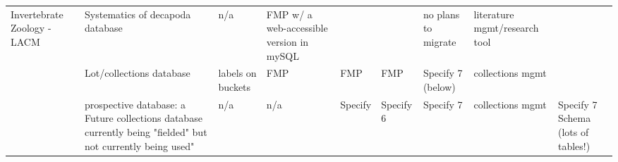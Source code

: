 \begin{tabular}{@{}lllllllll@{}}
\multicolumn{1}{|l|}{\multirow{3}{*}{Invertebrate Zoology - LACM}} & \multicolumn{1}{l|}{Systematics of decapoda database} & \multicolumn{1}{l|}{n/a} & \multicolumn{1}{l|}{FMP w/ a web-accessible version in mySQL} & \multicolumn{1}{l|}{} & \multicolumn{1}{l|}{} & \multicolumn{1}{l|}{no plans to migrate} & \multicolumn{1}{l|}{literature mgmt/research tool} &  \\ \cmidrule(lr){2-8}
\multicolumn{1}{|l|}{} & \multicolumn{1}{l|}{Lot/collections database} & \multicolumn{1}{l|}{labels on buckets} & \multicolumn{1}{l|}{FMP} & \multicolumn{1}{l|}{FMP} & \multicolumn{1}{l|}{FMP} & \multicolumn{1}{l|}{Specify 7 (below)} & \multicolumn{1}{l|}{collections mgmt} &  \\ \cmidrule(l){2-9} 
\multicolumn{1}{|l|}{} & \multicolumn{1}{l|}{prospective database: a Future collections database currently being "fielded" but not currently being used"} & \multicolumn{1}{l|}{n/a} & \multicolumn{1}{l|}{n/a} & \multicolumn{1}{l|}{Specify} & \multicolumn{1}{l|}{Specify 6} & \multicolumn{1}{l|}{Specify 7} & \multicolumn{1}{l|}{collections mgmt} & \multicolumn{1}{l|}{Specify 7 Schema (lots of tables!)} \\ \bottomrule
\end{tabular}